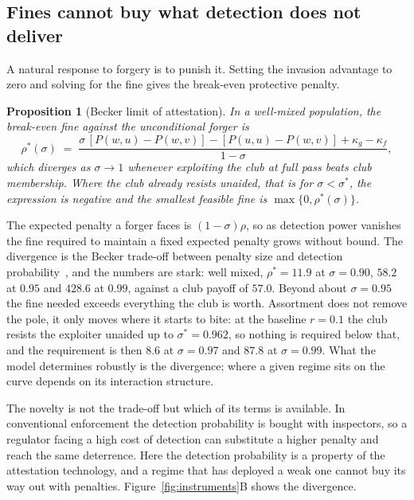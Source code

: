 \documentclass[11pt,a4paper]{article}
\newtheorem{proposition}[theorem]{Proposition}
\theoremstyle{definition}
\begin{document}
\subsection{Fines cannot buy what detection does not deliver}
\label{sec:fines}

A natural response to forgery is to punish it. Setting the invasion advantage
to zero and solving for the fine gives the break-even protective penalty.

\begin{proposition}[Becker limit of attestation]
\label{prop:fines}
In a well-mixed population, the break-even fine against the unconditional
forger is
\begin{equation}
\label{eq:rhostar}
\rho^{*}(\sigma) \;=\;
  \frac{\sigma\,[P(w,u) - P(w,v)] - [P(u,u) - P(w,v)] + \kappa_g - \kappa_f}
       {1 - \sigma},
\end{equation}
which diverges as $\sigma \to 1$ whenever exploiting the club at full pass
beats club membership. Where the club already resists unaided, that is for
$\sigma < \sigma^{*}$, the expression is negative and the smallest feasible
fine is $\max\{0,\rho^{*}(\sigma)\}$.
\end{proposition}

The expected penalty a forger faces is $(1 - \sigma)\rho$, so as detection power
vanishes the fine required to maintain a fixed expected penalty grows without
bound. The divergence is the Becker trade-off between penalty size and
detection probability~\citep{becker1968crime,polinsky2000economic}, and the
numbers are stark: well mixed, $\rho^{*} = 11.9$ at $\sigma = 0.90$, $58.2$ at
$0.95$ and $428.6$ at $0.99$, against a club payoff of $57.0$. Beyond about
$\sigma = 0.95$ the fine needed exceeds everything the club is worth. Assortment
does not remove the pole, it only moves where it starts to bite: at the
baseline $r = 0.1$ the club resists the exploiter unaided up to
$\sigma^{*} = 0.962$, so nothing is required below that, and the requirement is
then $8.6$ at $\sigma = 0.97$ and $87.8$ at $\sigma = 0.99$. What the model
determines robustly is the divergence; where a given regime sits on the curve
depends on its interaction structure.

The novelty is not the trade-off but which of its terms is available. In
conventional enforcement the detection probability is bought with inspectors,
so a regulator facing a high cost of detection can substitute a higher penalty
and reach the same deterrence. Here the detection probability is a property of
the attestation technology, and a regime that has deployed a weak one cannot
buy its way out with penalties. Figure~\ref{fig:instruments}B shows the
divergence.
\end{document}
